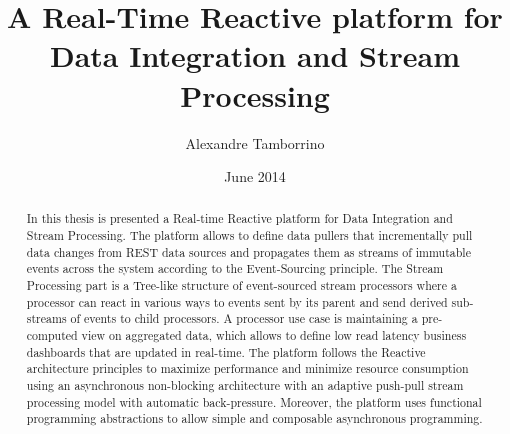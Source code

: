 \documentclass[a4paper,11pt]{kth-mag}
\title{A Real-Time Reactive platform for Data Integration and Stream Processing}
\author{Alexandre Tamborrino}
\date{June 2014}
\begin{document}
\frontmatter
\pagestyle{empty}
\removepagenumbers
\maketitle
{}

\begin{abstract}
In this thesis is presented a Real-time Reactive platform for Data Integration and Stream Processing. The platform allows to define data pullers that incrementally pull data changes from REST data sources and propagates them as streams of immutable events across the system according to the Event-Sourcing principle. The Stream Processing part is a Tree-like structure of event-sourced stream processors where a processor can react in various ways to events sent by its parent and send derived sub-streams of events to child processors. A processor use case is maintaining a pre-computed view on aggregated data, which allows to define low read latency business dashboards that are updated in real-time.
The platform follows the Reactive architecture principles to maximize performance and minimize resource consumption using an asynchronous non-blocking architecture with an adaptive push-pull stream processing model with automatic back-pressure. Moreover, the platform uses functional programming abstractions to allow simple and composable asynchronous programming.

\end{abstract}
\clearpage



\tableofcontents*

\mainmatter
\pagestyle{newchap}









\newpage
\printbibliography

\newpage
\listoffigures

\newpage
\listoflistings
\end{document}
